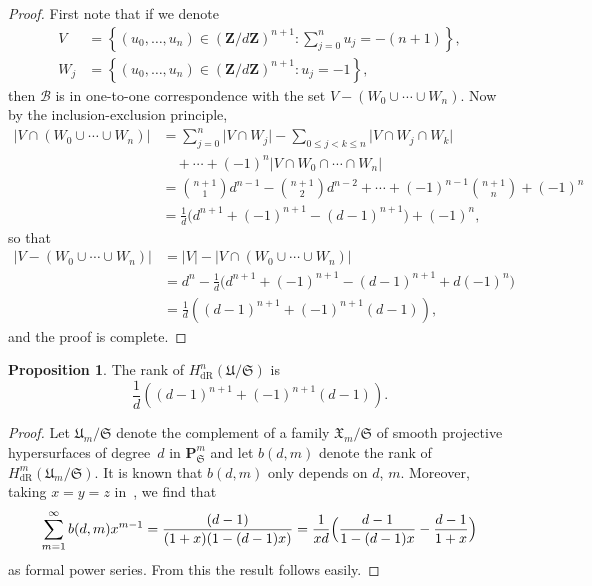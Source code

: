 \documentclass[a4paper,11pt]{article}
\numberwithin{equation}{section}
\providecommand{\abs}[1]{\lvert#1\rvert}                 %
\newcommand{\ZZ}{\mathbf{Z}} %
\providecommand{\HdR}{H_{\text{dR}}}    %
\providecommand{\cB}{\mathcal{B}} %
\theoremstyle{definition}
\newtheorem{prop}[thm]{Proposition}
\begin{document}
\begin{proof}
First note that if we denote
\begin{align*}
V   &= \left\{(u_0,\dotsc,u_n) \in (\ZZ/d\ZZ)^{n+1} : \sum_{j=0}^n u_j = -(n+1) \right\}, \\
W_j &= \left\{(u_0,\dotsc,u_n) \in (\ZZ/d\ZZ)^{n+1} : u_j = -1 \right\},
\end{align*}
then  $\cB$ is in one-to-one correspondence with the set $V-(W_0 \cup \dotsb \cup W_n)$. 
Now by the inclusion-exclusion principle, 
\begin{align*}
\abs{V \cap (W_0 \cup \dotsb \cup W_n)} 
& = \sum_{j=0}^n \abs{V \cap W_j} 
    - \sum_{0 \leq j < k \leq n} \abs{V \cap W_j \cap W_k} \\
& \quad + \dotsb + (-1)^{n} \abs{V \cap W_0 \cap \dotsb \cap W_n} \\
& = {n+1 \choose 1} d^{n-1} -{n+1 \choose 2} d^{n-2} 
    + \dotsb + (-1)^{n-1} {n+1 \choose n} + (-1)^{n} \\
& = \frac{1}{d} \bigl(d^{n+1}+(-1)^{n+1} - (d-1)^{n+1}\bigr)+(-1)^n,
\end{align*}
so that
\begin{align*}
\abs{V-(W_0 \cup \dotsb \cup W_n)}&=\abs{V}-\abs{V \cap (W_0 \cup \dotsb \cup W_n)} \\
&= d^n - \frac{1}{d} \bigl(d^{n+1}+(-1)^{n+1} - (d-1)^{n+1}+d (-1)^n \bigr) \\
&= \frac{1}{d} \left((d-1)^{n+1} + (-1)^{n+1}(d-1) \right),
\end{align*}
and the proof is complete.
\end{proof}

\begin{prop} \label{prop:rankcoho}
The rank of $\HdR^n(\mathfrak{U}/\mathfrak{S})$ is
\[
\frac{1}{d} \left((d-1)^{n+1} + (-1)^{n+1}(d-1) \right).
\]
\end{prop}

\begin{proof}
Let $\mathfrak{U}_m/\mathfrak{S}$ denote the complement of a family
$\mathfrak{X}_m/\mathfrak{S}$ of smooth projective hypersurfaces of 
degree~$d$ in $\mathbf{P}^m_{\mathfrak{S}}$ and let $b(d,m)$ denote 
the rank of $\HdR^m(\mathfrak{U}_m/\mathfrak{S})$. It is known that 
$b(d,m)$ only depends on $d$, $m$. Moreover, taking $x=y=z$ 
in~\citep[Corollaire~2.4~(i)]{sga7}, we find that
\[
\sum_{m=1}^{\infty} b(d,m) x^{m-1} 
  = \frac{(d-1)}{(1+x)(1-(d-1)x)} 
  = \frac{1}{xd} \Bigl( \frac{d-1}{1-(d-1)x} - \frac{d-1}{1+x} \Bigr)
\]
as formal power series. From this the result follows easily. 
\end{proof}
\end{document}
